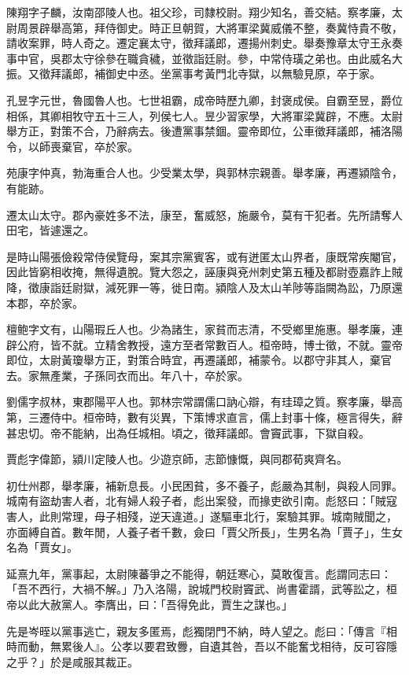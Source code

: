 \begin{pinyinscope}
陳翔字子麟，汝南邵陵人也。祖父珍，司隸校尉。翔少知名，善交結。察孝廉，太尉周景辟舉高第，拜侍御史。時正旦朝賀，大將軍梁冀威儀不整，奏冀恃貴不敬，請收案罪，時人奇之。遷定襄太守，徵拜議郎，遷揚州刺史。舉奏豫章太守王永奏事中官，吳郡太守徐參在職貪穢，並徵詣廷尉。參，中常侍璜之弟也。由此威名大振。又徵拜議郎，補御史中丞。坐黨事考黃門北寺獄，以無驗見原，卒于家。

孔昱字元世，魯國魯人也。七世祖霸，成帝時歷九卿，封褒成侯。自霸至昱，爵位相係，其卿相牧守五十三人，列侯七人。昱少習家學，大將軍梁冀辟，不應。太尉舉方正，對策不合，乃辭病去。後遭黨事禁錮。靈帝即位，公車徵拜議郎，補洛陽令，以師喪棄官，卒於家。

苑康字仲真，勃海重合人也。少受業太學，與郭林宗親善。舉孝廉，再遷潁陰令，有能跡。

遷太山太守。郡內豪姓多不法，康至，奮威怒，施嚴令，莫有干犯者。先所請奪人田宅，皆遽還之。

是時山陽張儉殺常侍侯覽母，案其宗黨賓客，或有迸匿太山界者，康既常疾閹官，因此皆窮相收掩，無得遺脫。覽大怨之，誣康與兗州刺史第五種及都尉壺嘉詐上賊降，徵康詣廷尉獄，減死罪一等，徙日南。潁陰人及太山羊陟等詣闕為訟，乃原還本郡，卒於家。

檀鲍字文有，山陽瑕丘人也。少為諸生，家貧而志清，不受鄉里施惠。舉孝廉，連辟公府，皆不就。立精舍教授，遠方至者常數百人。桓帝時，博士徵，不就。靈帝即位，太尉黃瓊舉方正，對策合時宜，再遷議郎，補蒙令。以郡守非其人，棄官去。家無產業，子孫同衣而出。年八十，卒於家。

劉儒字叔林，東郡陽平人也。郭林宗常謂儒口訥心辯，有珪璋之質。察孝廉，舉高第，三遷侍中。桓帝時，數有災異，下策博求直言，儒上封事十條，極言得失，辭甚忠切。帝不能納，出為任城相。頃之，徵拜議郎。會竇武事，下獄自殺。

賈彪字偉節，潁川定陵人也。少遊京師，志節慷慨，與同郡荀爽齊名。

初仕州郡，舉孝廉，補新息長。小民困貧，多不養子，彪嚴為其制，與殺人同罪。城南有盜劫害人者，北有婦人殺子者，彪出案發，而掾吏欲引南。彪怒曰：「賊寇害人，此則常理，母子相殘，逆天違道。」遂驅車北行，案驗其罪。城南賊聞之，亦面縛自首。數年閒，人養子者千數，僉曰「賈父所長」，生男名為「賈子」，生女名為「賈女」。

延熹九年，黨事起，太尉陳蕃爭之不能得，朝廷寒心，莫敢復言。彪謂同志曰：「吾不西行，大禍不解。」乃入洛陽，說城門校尉竇武、尚書霍諝，武等訟之，桓帝以此大赦黨人。李膺出，曰：「吾得免此，賈生之謀也。」

先是岑晊以黨事逃亡，親友多匿焉，彪獨閉門不納，時人望之。彪曰：「傳言『相時而動，無累後人』。公孝以要君致釁，自遺其咎，吾以不能奮戈相待，反可容隱之乎？」於是咸服其裁正。


\end{pinyinscope}

